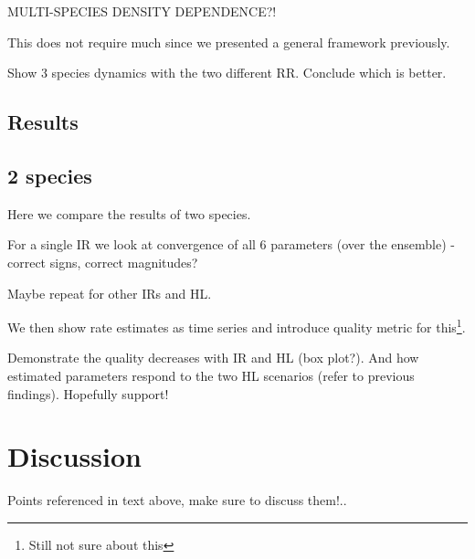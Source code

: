 MULTI-SPECIES DENSITY DEPENDENCE?!

This does not require much since we presented a general framework previously. 

Show 3 species dynamics with the two different RR. Conclude which is better. 

\subsection{Results}

\subsection{2 species}

Here we compare the results of two species. 

For a single IR we look at convergence of all 6 parameters (over the ensemble) - correct signs, correct magnitudes?

Maybe repeat for other IRs and HL.

We then show rate estimates as time series and introduce quality metric for this\footnote{Still not sure about this}.

Demonstrate the quality decreases with IR and HL (box plot?).
And how estimated parameters respond to the two HL scenarios (refer to previous findings). Hopefully support!




\section{Discussion}
\label{sec:discussion}

Points referenced in text above, make sure to discuss them!..

